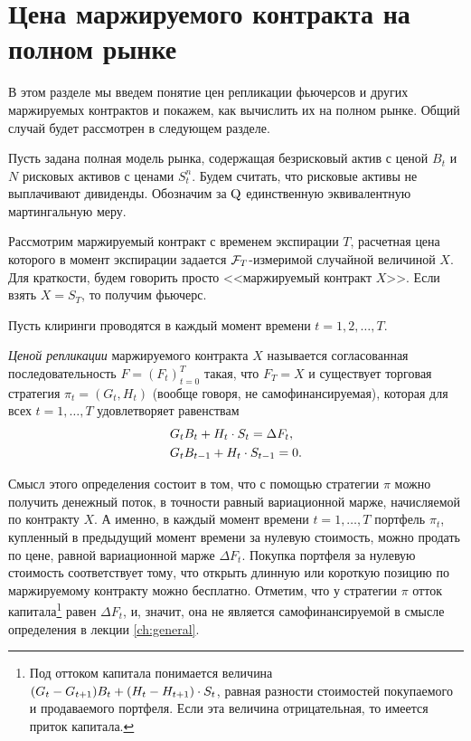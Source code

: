 \section{Цена маржируемого контракта на полном рынке}
\label{fut:s:complete}
В этом разделе мы введем понятие цен репликации фьючерсов и других маржируемых контрактов и покажем, как вычислить их на полном рынке.
Общий случай будет рассмотрен в следующем разделе. 

Пусть задана полная модель рынка, содержащая безрисковый актив с ценой $B_t$ и $N$ рисковых активов с ценами $S_t^n$.
Будем считать, что рисковые активы не выплачивают дивиденды.
Обозначим за $\mathrm{Q}$ единственную эквивалентную мартингальную меру.

Рассмотрим маржируемый контракт с временем экспирации $T$, расчетная цена которого в момент экспирации задается $\mathcal{F}_T$-измеримой случайной величиной $X$.
Для краткости, будем говорить просто <<маржируемый контракт $X$>>.
Если взять $X=S_T$, то получим фьючерс.

Пусть клиринги проводятся в каждый момент времени $t=1,2,\ldots,T$.

\begin{definition}
\label{fut:d:replication}
\emph{Ценой репликации} маржируемого контракта $X$ называется согласованная последовательность $F=(F_t)_{t=0}^T$ такая, что $F_T=X$ и существует торговая стратегия $\pi_t=(G_t,H_t)$ (вообще говоря, не самофинансируемая), которая для всех $t=1,\dots,T$ удовлетворяет равенствам
\begin{align}
\label{fut:complete-cur}
&G_tB_t + {H_t}\cdot{S_t} = \Delta F_t,\\
\label{fut:complete-next}
&G_tB_{t-1} + {H_t}\cdot{S_{t-1}} = 0.
\end{align}
\end{definition}

Смысл этого определения состоит в том, что с помощью стратегии $\pi$ можно получить денежный поток, в точности равный вариационной марже, начисляемой по контракту $X$.
А именно, в каждый момент времени $t=1,\dots,T$ портфель $\pi_t$, купленный в предыдущий момент времени за нулевую стоимость, можно продать по цене, равной вариационной марже $\Delta F_t$.
Покупка портфеля за нулевую стоимость соответствует тому, что открыть длинную или короткую позицию по маржируемому контракту можно бесплатно.
Отметим, что у стратегии $\pi$ отток капитала\footnote{Под оттоком капитала понимается величина $(G_t-G_{t+1})B_t + {(H_t-H_{t+1})}\cdot{S_t}$, равная разности стоимостей покупаемого и продаваемого портфеля. Если эта величина отрицательная, то имеется приток капитала.} равен $\Delta F_t$, и, значит, она не является самофинансируемой в смысле определения в лекции \ref{ch:general}. 

